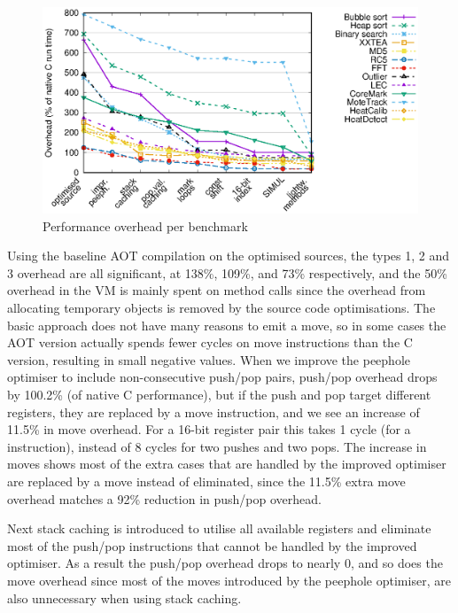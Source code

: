 \begin{figure}
\centering
\includegraphics[width=\mygraphsize]{performance-per-benchmark3a.eps}
\caption{Performance overhead per benchmark}
\label{fig-performance-per-benchmark}
\end{figure}

Using the baseline AOT compilation on the optimised sources, the types 1, 2 and 3 overhead are all significant, at 138\%,  109\%, and 73\% respectively, and the 50\% overhead in the VM is mainly spent on method calls since the overhead from allocating temporary objects is removed by the source code optimisations. The basic approach does not have many reasons to emit a move, so in some cases the AOT version actually spends fewer cycles on move instructions than the C version, resulting in small negative values.  When we improve the peephole optimiser to include non-consecutive push/pop pairs, push/pop overhead drops by 100.2\% (of native C performance), but if the push and pop target different registers, they are replaced by a move instruction, and we see an increase of 11.5\% in move overhead. For a 16-bit register pair this takes 1 cycle (for a  instruction), instead of 8 cycles for two pushes and two pops. The increase in moves shows most of the extra cases that are handled by the improved optimiser are replaced by a move instead of eliminated, since the 11.5\% extra move overhead matches a 92\% reduction in push/pop overhead.

Next stack caching is introduced to utilise all available registers and eliminate most of the push/pop instructions that cannot be handled by the improved optimiser. As a result the push/pop overhead drops to nearly 0, and so does the move overhead since most of the moves introduced by the peephole optimiser, are also unnecessary when using stack caching.

